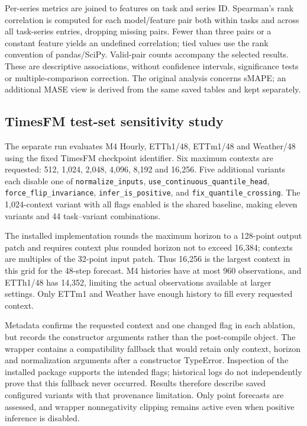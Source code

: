Per-series metrics are joined to features on task and series ID. Spearman's rank correlation is computed for each model/feature pair both within tasks and across all task-series entries, dropping missing pairs. Fewer than three pairs or a constant feature yields an undefined correlation; tied values use the rank convention of pandas/SciPy. Valid-pair counts accompany the selected results. These are descriptive associations, without confidence intervals, significance tests or multiple-comparison correction. The original analysis concerns sMAPE; an additional MASE view is derived from the same saved tables and kept separately.

\subsection{TimesFM test-set sensitivity study}\label{sec:sensitivity}
The separate run evaluates M4 Hourly, ETTh1/48, ETTm1/48 and Weather/48 using the fixed TimesFM checkpoint identifier. Six maximum contexts are requested: 512, 1,024, 2,048, 4,096, 8,192 and 16,256. Five additional variants each disable one of \texttt{normalize\_inputs}, \texttt{use\_continuous\_quantile\_head}, \texttt{force\_flip\_invariance}, \texttt{infer\_is\_positive}, and \texttt{fix\_quantile\_crossing}. The 1,024-context variant with all flags enabled is the shared baseline, making eleven variants and 44 task--variant combinations.

The installed implementation rounds the maximum horizon to a 128-point output patch and requires context plus rounded horizon not to exceed 16,384; contexts are multiples of the 32-point input patch. Thus 16,256 is the largest context in this grid for the 48-step forecast. M4 histories have at most 960 observations, and ETTh1/48 has 14,352, limiting the actual observations available at larger settings. Only ETTm1 and Weather have enough history to fill every requested context.

Metadata confirms the requested context and one changed flag in each ablation, but records the constructor arguments rather than the post-compile object. The wrapper contains a compatibility fallback that would retain only context, horizon and normalization arguments after a constructor TypeError. Inspection of the installed package supports the intended flags; historical logs do not independently prove that this fallback never occurred. Results therefore describe saved configured variants with that provenance limitation. Only point forecasts are assessed, and wrapper nonnegativity clipping remains active even when positive inference is disabled.


